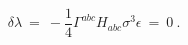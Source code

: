 \begin{equation}
\label{dilatino:variation}
  \delta \lambda \: = \:
  - \frac{1}{4} \Gamma^{abc} H_{abc} \sigma^3  \epsilon \: = \: 0 \ .
\end{equation}

